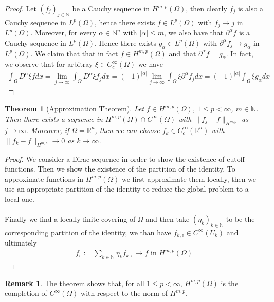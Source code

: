 \documentclass[11pt,a4paper]{article}
\newtheorem{thm}{Theorem}[section]
\theoremstyle{definition}
\newtheorem{rem}{Remark}[section]
\begin{document}
\begin{proof}
Let $(f_j)_{j \in \mathbb{N}}$ be a Cauchy sequence in $H^{m,p}( \Omega)$, then clearly $f_j$ is also a Cauchy sequence in $L^p( \Omega)$, hence there exists $f \in L^p( \Omega)$ with $f_j \to j$ in $L^p(\Omega)$. Moreover, for every $\alpha \in \mathbb{N}^n$ with $| \alpha| \leq m$, we also have that $\partial^\alpha f$ is a Cauchy sequence in $L^p(\Omega)$. Hence there exists $g_\alpha \in L^p( \Omega)$ with $\partial^\alpha f_j \to g_\alpha$ in $L^p(\Omega)$. We claim that that in fact $f \in H^{m,p}(\Omega)$ and that $\partial^\alpha f = g_\alpha$. In fact, we observe that for arbitray $\xi \in C_c^\infty(\Omega)$ we have
\begin{align*}
\int_{\Omega} D^\alpha \xi f dx = \lim_{j \to \infty} \int_{\Omega} D^\alpha \xi f_j dx = (-1)^{| \alpha|} \lim_{j \to \infty} \int_\Omega \xi \partial^\alpha f_j dx = (-1)^{|\alpha|} \int_\Omega \xi g_\alpha dx
\end{align*}
\end{proof}
\begin{thm}[Approximation Theorem] Let $f \in H^{m,p}(\Omega)$, $1 \leq p < \infty$, $m \in \mathbb{N}$. Then there exists a sequence in $H^{m,p}(\Omega) \cap C^\infty( \Omega)$ with $\| f_j-f\|_{H^{m,p}}$ as $j \to \infty$. Moreover, if $\Omega = \mathbb{R}^n$, then we can choose $f_k \in C_c^\infty( \mathbb{R}^n)$ with $\|f_k-f\|_{H^{m,p}} \to 0$ as $k \to \infty$.
\end{thm}
\begin{proof}
We consider a Dirac sequence in order to show the existence of cutoff functions. Then we show the existence of the partition of the identity. To approximate functions in $H^{m,p}( \Omega)$ we first approximate them locally, then we use an appropriate partition of the identity to reduce the global problem to a local one.\\
\\
Finally we find a locally finite covering of $\Omega$ and then take $( \eta_k)_{k \in \mathbb{N}}$ to be the corresponding partition of the identity, we than have $f_{k, \epsilon} \in C^\infty (U_k)$ and ultimately 
\begin{align*}
f_\epsilon := \sum_{k \in \mathbb{N}} \eta_k f_{k, \epsilon} \to f \text{ in } H^{m,p}( \Omega)
\end{align*}
\end{proof}
\begin{rem} The theorem shows that, for all $1 \leq p < \infty$, $H^{m,p}(\Omega)$ is the completion of $C^\infty(\Omega)$ with respect to the norm of $H^{m,p}$. 
\end{rem}
\end{document}
